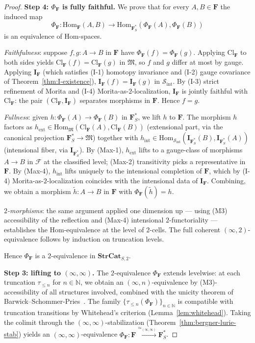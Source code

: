 \documentclass[11pt]{article}
\theoremstyle{plain}
\theoremstyle{definition}
\newcommand{\cS}{\mathcal{S}}
\newcommand{\cF}{\mathcal{F}}
\newcommand{\fM}{\mathfrak{M}}
\newcommand{\Sint}{\cS_{\mathrm{int}}}
\newcommand{\Hom}{\mathrm{Hom}}
\newcommand{\Cl}{\mathrm{Cl}}
\newcommand{\II}{\mathbf{I}}
\begin{document}
\begin{proof}
\textbf{Step 4: $\Phi_\mathbf{F}$ is fully faithful.} We prove that for every $A, B \in \mathbf{F}$ the induced map
\[ \Phi_\mathbf{F} : \Hom_\mathbf{F}(A, B) \longrightarrow \Hom_{\mathbf{F}_S^*}(\Phi_\mathbf{F}(A), \Phi_\mathbf{F}(B)) \]
is an equivalence of Hom-spaces.

\emph{Faithfulness}: suppose $f, g : A \to B$ in $\mathbf{F}$ have $\Phi_\mathbf{F}(f) = \Phi_\mathbf{F}(g)$. Applying $\Cl_\mathbf{F}$ to both sides yields $\Cl_\mathbf{F}(f) = \Cl_\mathbf{F}(g)$ in $\fM$, so $f$ and $g$ differ at most by gauge. Applying $\II_\mathbf{F}$ (which satisfies (I-1) homotopy invariance and (I-2) gauge covariance of Theorem~\ref{thm:I-existence}), $\II_\mathbf{F}(f) = \II_\mathbf{F}(g)$ in $\Sint$. By (I-3) strict refinement of Morita and (I-4) Morita-as-$2$-localization, $\II_\mathbf{F}$ is jointly faithful with $\Cl_\mathbf{F}$: the pair $(\Cl_\mathbf{F}, \II_\mathbf{F})$ separates morphisms in $\mathbf{F}$. Hence $f = g$.

\emph{Fullness}: given $h : \Phi_\mathbf{F}(A) \to \Phi_\mathbf{F}(B)$ in $\mathbf{F}_S^*$, we lift $h$ to $\mathbf{F}$. The morphism $h$ factors as $h_{\mathrm{ext}} \in \Hom_\fM(\Cl_\mathbf{F}(A), \Cl_\mathbf{F}(B))$ (extensional part, via the canonical projection $\mathbf{F}_S^* \to \fM$) together with $h_{\mathrm{int}} \in \Hom_{\Sint}(\II_{\mathbf{F}_S^*}(B), \II_{\mathbf{F}_S^*}(A))$ (intensional fiber, via $\II_{\mathbf{F}_S^*}$). By (Max-1), $h_{\mathrm{ext}}$ lifts to a gauge-class of morphisms $A \to B$ in $\cF$ at the classified level; (Max-2) transitivity picks a representative in $\mathbf{F}$. By (Max-4), $h_{\mathrm{int}}$ lifts uniquely to the intensional completion of $\mathbf{F}$, which by (I-4) Morita-as-$2$-localization coincides with the intensional data of $\II_\mathbf{F}$. Combining, we obtain a morphism $\tilde h : A \to B$ in $\mathbf{F}$ with $\Phi_\mathbf{F}(\tilde h) = h$.

\emph{$2$-morphisms}: the same argument applied one dimension up --- using (M3) accessibility of the reflection and (Max-4) intensional $2$-functoriality --- establishes the Hom-equivalence at the level of $2$-cells. The full coherent $(\infty, 2)$-equivalence follows by induction on truncation levels.

Hence $\Phi_\mathbf{F}$ is a $2$-equivalence in $\mathbf{StrCat}_{S, 2}$.

\textbf{Step 3: lifting to $(\infty, \infty)$.} The $2$-equivalence $\Phi_\mathbf{F}$ extends levelwise: at each truncation $\tau_{\leq n}$ for $n \in \mathbb{N}$, we obtain an $(\infty, n)$-equivalence by (M3)-accessibility of all structures involved, combined with the unicity theorem of Barwick--Schommer-Pries~\cite{BarwickSchommerPries2021}. The family $\{\tau_{\leq n}(\Phi_\mathbf{F})\}_{n \in \mathbb{N}}$ is compatible with truncation transitions by Whitehead's criterion (Lemma~\ref{lem:whitehead}). Taking the colimit through the $(\infty, \infty)$-stabilization (Theorem~\ref{thm:bergner-lurie-stab}) yields an $(\infty, \infty)$-equivalence $\Phi_\mathbf{F} : \mathbf{F} \xrightarrow{\simeq_{(\infty, \infty)}} \mathbf{F}_S^*$.


\end{proof}
\end{document}
